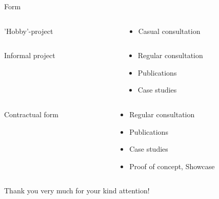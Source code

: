 \documentclass[aspectratio=169]{beamer}
\begin{document}
\begin{frame}{Form}
    \pause
    \begin{columns}[T]
        \begin{column}{0.2\textwidth}
            'Hobby'-project
        \end{column}
        \begin{column}{0.7\textwidth}
            \begin{itemize}
                \item Casual consultation
            \end{itemize}
        \end{column}
    \end{columns}
    \vspace*{1cm}
    \pause
    \begin{columns}[T]
        \begin{column}{0.2\textwidth}
            Informal project
        \end{column}
        \begin{column}{0.7\textwidth}
            \begin{itemize}
                \item Regular consultation
                \item Publications
                \item Case studies
            \end{itemize}
        \end{column}
    \end{columns}
    \vspace*{1cm}
    \pause
    \begin{columns}[T]
        \begin{column}{0.2\textwidth}
            Contractual form
        \end{column}
        \begin{column}{0.7\textwidth}
            \begin{itemize}
                \item Regular consultation
                \item Publications
                \item Case studies
                \item Proof of concept, Showcase
            \end{itemize}
        \end{column}
    \end{columns}
\end{frame}

\begin{frame}
    \thispagestyle{empty}
    \centering \Large
    Thank you very much for your kind attention!
\end{frame}
\end{document}

